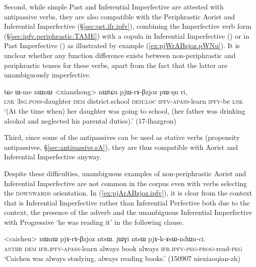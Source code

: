 Second, while simple Past and Inferential Imperfective are attested with antipassive verbs, they are also compatible with the Periphrastic Aorist and Inferential Imperfective (§\ref{sec:pst.ifr.ipfv}), combining the Imperfective verb form (§\ref{sec:ipfv.periphrastic.TAME}) with a copula in Inferential Imperfective () or in Past Imperfective () as illustrated by example (\ref{ex:pjWrABzjoz.pWNu}). It is unclear whether any function difference exists between non-periphrastic and periphrastic tenses for these verbs, apart from the fact that the latter are unambiguously imperfective.
 
\begin{exe}
\ex \label{ex:pjWrABzjoz.pWNu}
\gll tɕe ɯ-me nɯnɯ <xianzhong> nɯtɕu pjɯ-rɤ-βzjoz pɯ-ŋu ri, \\
\textsc{lnk} \textsc{3sg}.\textsc{poss}-daughter \textsc{dem} district.school \textsc{dem}:\textsc{loc} \textsc{ipfv}-\textsc{apass}-learn \textsc{ipfv}-be \textsc{lnk} \\
\glt `(At the time when) her daughter was going to school, (her father was drinking alcohol and neglected his parental duties).' (17-lhazgron)
\end{exe}

Third, since some of the  antipassives can be used as stative verbs (propensity antipassives, §\ref{sec:antipassive.sA}), they are thus compatible with Aorist and Inferential Imperfective anyway.

Despite these difficulties, unambiguous examples of  non-periphrastic Aorist and Inferential Imperfective are not common  in the corpus even with verbs selecting the \textsc{downwards} orientation. In (\ref{ex:pjArABzjoz.ipfv}), it is clear from the context that  is Inferential Imperfective rather than Inferential Perfective both due to the context, the presence of the adverb  and the unambiguous  Inferential Imperfective with Progressive  `he was reading it' in the following clause.

\begin{exe}
\ex \label{ex:pjArABzjoz.ipfv}
\gll <caichen> nɯnɯ pjɤ-rɤ-βzjoz ntsɯ. jɯɣi ntsɯ pjɤ-k-ɤsɯ-ndɯn-ci. \\
\textsc{anthr} \textsc{dem} \textsc{ifr}.\textsc{ipfv}-\textsc{apass}-learn always book always \textsc{ifr}.\textsc{ipfv}-\textsc{peg}-\textsc{prog}-read-\textsc{peg} \\
\glt `Caichen was always studying, always reading books.' (150907 niexiaoqian-zh) 
\end{exe}

